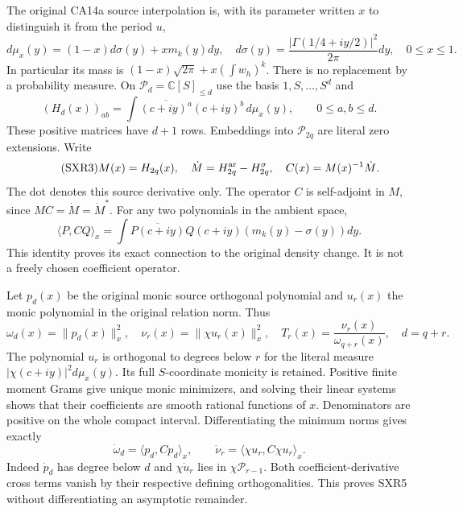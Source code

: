 \documentclass[11pt,a4paper]{article}
\begin{document}
The original CA14a source interpolation is, with its parameter written
$x$ to distinguish it from the period $u$,
\begin{equation}\tag{SXR2}
 d\mu_x(y)=(1-x)d\sigma(y)+x m_k(y)dy,\quad
 d\sigma(y)=\frac{|\Gamma(1/4+iy/2)|^2}{2\pi}dy,
 \quad 0\le x\le1.
\end{equation}
In particular its mass is
$(1-x)\sqrt{2\pi}+x(\int w_h)^k$. There is no replacement by
a probability measure. On $\mathcal P_d=\mathbb C[S]_{\le d}$
use the basis $1,S,\ldots,S^d$ and
\[
 (H_d(x))_{ab}=\int\overline{(c+iy)^a}(c+iy)^b\,d\mu_x(y),
 \qquad 0\le a,b\le d.
\]
These positive matrices have $d+1$ rows. Embeddings into
$\mathcal P_{2q}$ are literal zero extensions. Write
\begin{equation}\tag{SXR3}
 M(x)=H_{2q}(x),\quad \dot M=H_{2q}^{\rm ar}-H_{2q}^{\sigma},
 \quad C(x)=M(x)^{-1}\dot M.
\end{equation}
The dot denotes this source derivative only. The operator $C$ is
self-adjoint in $M$, since $MC=\dot M=\dot M^*$. For any two
polynomials in the ambient space,
\[
 \langle P,CQ\rangle_x
   =\int\overline{P(c+iy)}Q(c+iy)
                     (m_k(y)-\sigma(y))dy.
\]
This identity proves its exact connection to the original density
change. It is not a freely chosen coefficient operator.

Let $p_d(x)$ be the original monic source orthogonal polynomial and
$u_r(x)$ the monic polynomial in the original relation norm. Thus
\begin{equation}\tag{SXR4}
 \omega_d(x)=\|p_d(x)\|_x^2,\quad
 \nu_r(x)=\|\chi u_r(x)\|_x^2,\quad
 T_r(x)=\frac{\nu_r(x)}{\omega_{q+r}(x)},\quad d=q+r.
\end{equation}
The polynomial $u_r$ is orthogonal to degrees below $r$ for the
literal measure $|\chi(c+iy)|^2d\mu_x(y)$. Its full $S$-coordinate
monicity is retained. Positive finite moment Grams give unique monic
minimizers, and solving their linear systems shows that their
coefficients are smooth rational functions of $x$. Denominators
are positive on the whole compact interval. Differentiating the
minimum norms gives exactly
\begin{equation}\tag{SXR5}
 \dot\omega_d=\langle p_d,Cp_d\rangle_x,\qquad
 \dot\nu_r=\langle\chi u_r,C\chi u_r\rangle_x.
\end{equation}
Indeed $\dot p_d$ has degree below $d$ and $\chi\dot u_r$ lies
in $\chi\mathcal P_{r-1}$. Both coefficient-derivative cross terms
vanish by their respective defining orthogonalities. This proves
SXR5 without differentiating an asymptotic remainder.
\end{document}
